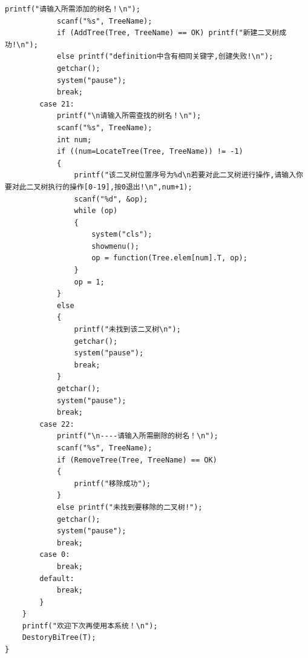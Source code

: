 \documentclass[supercite]{HustGraduPaper}
\theoremstyle{definition}
\begin{document}
\begin{lstlisting}[caption=二叉树,style=二叉树,title=二叉树]
			printf("请输入所需添加的树名！\n");
			scanf("%s", TreeName);
			if (AddTree(Tree, TreeName) == OK) printf("新建二叉树成功!\n");
			else printf("definition中含有相同关键字,创建失败!\n");
			getchar();
			system("pause");
			break;
		case 21:
			printf("\n请输入所需查找的树名！\n");
			scanf("%s", TreeName);
			int num;
			if ((num=LocateTree(Tree, TreeName)) != -1)
			{
				printf("该二叉树位置序号为%d\n若要对此二叉树进行操作,请输入你要对此二叉树执行的操作[0-19],按0退出!\n",num+1);
				scanf("%d", &op);
				while (op)
				{
					system("cls");
					showmenu();
					op = function(Tree.elem[num].T, op);
				}
				op = 1;
			}
			else
			{
				printf("未找到该二叉树\n");
				getchar();
				system("pause");
				break;
			}
			getchar();
			system("pause");
			break;
		case 22:
			printf("\n----请输入所需删除的树名！\n");
			scanf("%s", TreeName);
			if (RemoveTree(Tree, TreeName) == OK)
			{
				printf("移除成功");
			}
			else printf("未找到要移除的二叉树!");
			getchar();
			system("pause");
			break;
		case 0:
			break;
		default:
			break;
		}
	}
	printf("欢迎下次再使用本系统！\n");
	DestoryBiTree(T);
}
\end{lstlisting}
\newpage
\end{document}
